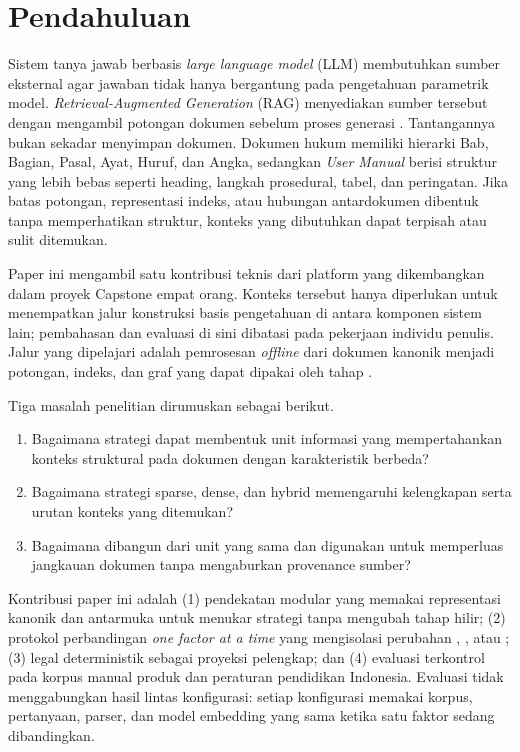 \section{Pendahuluan}

Sistem tanya jawab berbasis \textit{large language model} (LLM) membutuhkan sumber eksternal agar jawaban tidak hanya bergantung pada pengetahuan parametrik model. \textit{Retrieval-Augmented Generation} (RAG) menyediakan sumber tersebut dengan mengambil potongan dokumen sebelum proses generasi \cite{lewisRetrievalAugmentedGenerationKnowledgeIntensive2021,huangSurveyRetrievalAugmentedText2024}. Tantangannya bukan sekadar menyimpan dokumen. Dokumen hukum memiliki hierarki Bab, Bagian, Pasal, Ayat, Huruf, dan Angka, sedangkan \textit{User Manual} berisi struktur yang lebih bebas seperti heading, langkah prosedural, tabel, dan peringatan. Jika batas potongan, representasi indeks, atau hubungan antardokumen dibentuk tanpa memperhatikan struktur, konteks yang dibutuhkan dapat terpisah atau sulit ditemukan.

Paper ini mengambil satu kontribusi teknis dari platform \omnirag yang dikembangkan dalam proyek Capstone empat orang. Konteks tersebut hanya diperlukan untuk menempatkan jalur konstruksi basis pengetahuan di antara komponen sistem lain; pembahasan dan evaluasi di sini dibatasi pada pekerjaan individu penulis. Jalur yang dipelajari adalah pemrosesan \textit{offline} dari dokumen kanonik menjadi potongan, indeks, dan graf yang dapat dipakai oleh tahap \retrieval.

Tiga masalah penelitian dirumuskan sebagai berikut.

\begin{enumerate}
    \item Bagaimana strategi \chunker dapat membentuk unit informasi yang mempertahankan konteks struktural pada dokumen dengan karakteristik berbeda?
    \item Bagaimana strategi \indexer sparse, dense, dan hybrid memengaruhi kelengkapan serta urutan konteks yang ditemukan?
    \item Bagaimana \kg dibangun dari unit yang sama dan digunakan untuk memperluas jangkauan dokumen tanpa mengaburkan provenance sumber?
\end{enumerate}

Kontribusi paper ini adalah (1) pendekatan modular yang memakai representasi kanonik dan antarmuka \plugin untuk menukar strategi tanpa mengubah tahap hilir; (2) protokol perbandingan \textit{one factor at a time} yang mengisolasi perubahan \chunker, \indexer, atau \kg; (3) legal \kg deterministik sebagai proyeksi pelengkap; dan (4) evaluasi terkontrol pada korpus manual produk dan peraturan pendidikan Indonesia. Evaluasi tidak menggabungkan hasil lintas konfigurasi: setiap konfigurasi memakai korpus, pertanyaan, parser, dan model embedding yang sama ketika satu faktor sedang dibandingkan.


